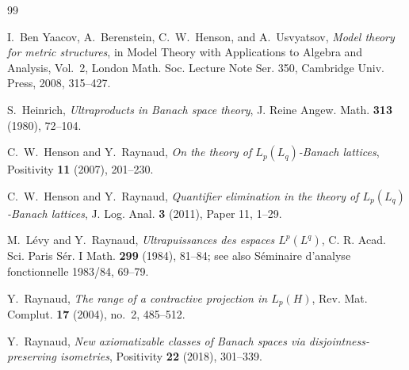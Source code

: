 \documentclass[11pt]{article}
\newcommand{\1}{\mathbf 1}
\theoremstyle{definition}
\theoremstyle{remark}
\begin{document}
\begin{thebibliography}{99}

I.~Ben Yaacov, A.~Berenstein, C.~W.~Henson, and A.~Usvyatsov,
\emph{Model theory for metric structures},
in Model Theory with Applications to Algebra and Analysis, Vol.~2,
London Math. Soc. Lecture Note Ser. 350, Cambridge Univ. Press, 2008,
315--427.

S.~Heinrich,
\emph{Ultraproducts in Banach space theory},
J. Reine Angew. Math. \textbf{313} (1980), 72--104.


C.~W.~Henson and Y.~Raynaud,
\emph{On the theory of $L_p(L_q)$-Banach lattices},
Positivity \textbf{11} (2007), 201--230.


C.~W.~Henson and Y.~Raynaud,
\emph{Quantifier elimination in the theory of $L_p(L_q)$-Banach lattices},
J. Log. Anal. \textbf{3} (2011), Paper 11, 1--29.

M.~L\'evy and Y.~Raynaud,
\emph{Ultrapuissances des espaces $L^p(L^q)$},
C. R. Acad. Sci. Paris S\'er. I Math. \textbf{299} (1984), 81--84;
see also S\'eminaire d'analyse fonctionnelle 1983/84, 69--79.

Y.~Raynaud,
\emph{The range of a contractive projection in $L_p(H)$},
Rev. Mat. Complut. \textbf{17} (2004), no.~2, 485--512.

Y.~Raynaud,
\emph{New axiomatizable classes of Banach spaces via
disjointness-preserving isometries},
Positivity \textbf{22} (2018), 301--339.

\end{thebibliography}
\end{document}
